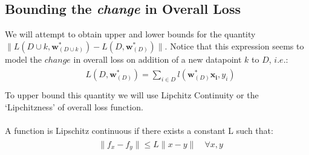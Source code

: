 \documentclass[12pt]{article}
\begin{document}
\subsection{Bounding the \textit{change} in Overall Loss}
We will attempt to obtain upper and lower bounds for the quantity $\|L(D \cup k, \boldsymbol{w}^{*}_{(D \cup k)}) - L(D,\boldsymbol{w}^{*}_{(D)})\|$. Notice that this expression seems to model the $change$ in overall loss on addition of a new datapoint $k$ to $D$, $i.e.$:
\begin{gather}
    \begin{aligned}
        & L(D,\boldsymbol{w}^{*}_{(D)}) = \sum_{i\in D} l(\boldsymbol{w}^{*}_{(D)}\boldsymbol{x_i},y_i)  \\
    \end{aligned}
\end{gather}
To upper bound this quantity we will use Lipchitz Continuity or the `Lipchitzness' of overall loss function.\\
\\A function is Lipschitz continuous if there exists a constant L such that:
\begin{gather}
    \begin{aligned}
        & \|f_x - f_y\|  \leqslant
         L\|x - y\| \quad \forall x,y  \\
    \end{aligned}
\end{gather}
\end{document}
